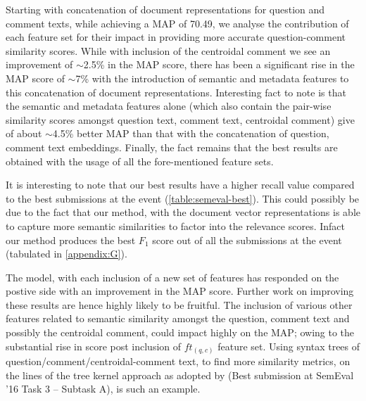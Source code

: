 \documentclass[12pt, a4paper, oneside]{Thesis} %
\begin{document}
Starting with concatenation of document representations for question and comment texts, while achieving a MAP of 70.49, we analyse the contribution of each feature set for their impact in providing more accurate question-comment similarity scores. While with inclusion of the centroidal comment we see an improvement of $\sim$2.5\% in the MAP score, there has been a significant rise in the MAP score of $\sim$7\% with the introduction of semantic and metadata features to this concatenation of document representations. Interesting fact to note is that the semantic and metadata features alone (which also contain the pair-wise similarity scores amongst question text, comment text, centroidal comment) give of about $\sim$4.5\% better MAP than that with the concatenation of question, comment text embeddings. Finally, the fact remains that the best results are obtained with the usage of all the fore-mentioned feature sets.

It is interesting to note that our best results have a higher recall value compared to the best submissions at the event (\autoref{table:semeval-best}). This could possibly be due to the fact that our method, with the document vector representations is able to capture more semantic similarities to factor into the relevance scores. Infact our method produces the best $F_{1}$ score out of all the submissions at the event (tabulated in \autoref{appendix:G}).

The model, with each inclusion of a new set of features has responded on the postive side with an improvement in the MAP score. Further work on improving these results are hence highly likely to be fruitful. The inclusion of various other features related to semantic similarity amongst the question, comment text and possibly the centroidal comment, could impact highly on the MAP; owing to the substantial rise in score post inclusion of $ft_{(q,c)}$ feature set. Using syntax trees of question/comment/centroidal-comment text, to find more similarity metrics, on the lines of the tree kernel approach as adopted by \cite{filice2016kelp} (Best submission at SemEval '16 Task 3 -- Subtask A), \cite{joty2016convkn} is such an example.


\end{document}
